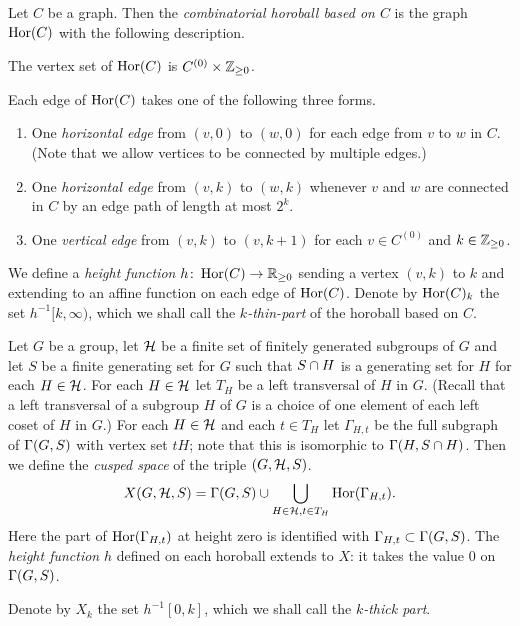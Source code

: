 \begin{definition}
  Let $C$ be a graph.
  Then the \emph{combinatorial horoball based on $C$} is the graph $\operatorname{Hor}(C)$ with the following description.
  
  The vertex set of $\operatorname{Hor}(C)$ is $C^{(0)} \times \mathbb{Z}_{\geq 0}$.

  Each edge of $\operatorname{Hor}(C)$ takes one of the following three forms.
  \begin{enumerate}
    \item One \emph{horizontal edge} from $(v, 0)$ to $(w, 0)$ for each edge from $v$ to $w$ in $C$. (Note that we allow vertices to be connected by multiple edges.)
    \item One \emph{horizontal edge} from $(v, k)$ to $(w, k)$ whenever $v$ and $w$ are connected in $C$ by an edge path of length at most $2^k$.
    \item One \emph{vertical edge} from $(v, k)$ to $(v, k+1)$ for each $v \in C^{(0)}$ and $k \in \mathbb{Z}_{\geq 0}$.
  \end{enumerate}

  We define a \emph{height function} $h \colon \operatorname{Hor}(C) \to \mathbb{R}_{\geq 0}$ sending a vertex $(v, k)$ to $k$ and extending to an affine function on each edge of $\operatorname{Hor}(C)$.
  Denote by $\operatorname{Hor}(C)_k$ the set $h^{-1}[k,\infty)$, which we shall call the \emph{$k$-thin-part} of the horoball based on $C$.
\end{definition}

\begin{definition}\label{definition:cusped_space}
  Let $G$ be a group, let $\mathcal{H}$ be a finite set of finitely generated subgroups of $G$ and let $S$ be a finite generating set for $G$ such that $S \cap H$ is a generating set for $H$ for each $H \in \mathcal{H}$.
  For each $H \in \mathcal{H}$ let $T_H$ be a left transversal of $H$ in $G$.
  (Recall that a left transversal of a subgroup $H$ of $G$ is a choice of one element of each left coset of $H$ in $G$.)
  For each $H \in \mathcal{H}$ and each $t \in T_H$ let $\Gamma_{H, t}$ be the full subgraph of $\operatorname{\Gamma}(G, S)$ with vertex set $tH$; note that this is isomorphic to $\operatorname{\Gamma}(H,S \cap H)$.
  Then we define the \emph{cusped space} of the triple $(G, \mathcal{H}, S)$.
  \begin{align}
    X(G, \mathcal{H}, S) = \operatorname{\Gamma}(G, S) \cup \bigcup_{H \in \mathcal{H}, t \in T_H} \operatorname{Hor}(\Gamma_{H, t}).
  \end{align}
  Here the part of $\operatorname{Hor}(\Gamma_{H, t})$ at height zero is identified with $\Gamma_{H, t} \subset \operatorname{\Gamma}(G,S)$.
  The \emph{height function} $h$ defined on each horoball extends to $X$: it takes the value $0$ on $\operatorname{\Gamma}(G,S)$.

  Denote by $X_k$ the set $h^{-1}[0,k]$, which we shall call the \emph{$k$-thick part}.
\end{definition}

